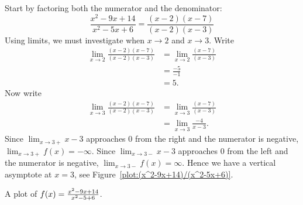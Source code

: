 \begin{solution}
Start by factoring both the numerator and the denominator:
\[
\frac{x^2-9x+14}{x^2-5x+6} = \frac{(x-2)(x-7)}{(x-2)(x-3)}
\]
Using limits, we must investigate when $x\to 2$ and $x\to 3$. Write
\begin{align*}
\lim_{x\to 2} \frac{(x-2)(x-7)}{(x-2)(x-3)} &= \lim_{x\to 2} \frac{(x-7)}{(x-3)}\\
&= \frac{-5}{-1}\\
&=5.
\end{align*}
Now write
\begin{align*}
\lim_{x\to 3} \frac{(x-2)(x-7)}{(x-2)(x-3)} &= \lim_{x\to 3} \frac{(x-7)}{(x-3)}\\
&= \lim_{x\to 3}\frac{-4}{x-3}.
\end{align*}
Since $\lim_{x\to 3+} x-3$ approaches $0$ from the right and the
numerator is negative, $\lim_{x\to 3+} f(x) = -\infty$. Since
$\lim_{x\to 3-} x-3$ approaches $0$ from the left and the numerator is
negative, $\lim_{x\to 3-} f(x) = \infty$. Hence we have a vertical
asymptote at $x=3$, see Figure~\ref{plot:(x^2-9x+14)/(x^2-5x+6)}.
\end{solution}
\begin{marginfigure}[0in]
\caption{A plot of $f(x)=\protect\frac{x^2-9x+14}{x^2-5+6}$.}
\label{plot:(x^2-9x+14)/(x^2-5x+6)}
\end{marginfigure}


